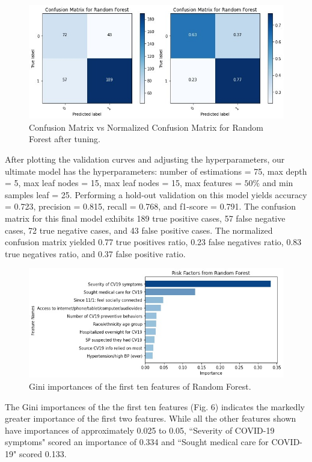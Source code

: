 \documentclass{article}
\begin{document}
\begin{figure}[H]
    \center
    \includegraphics[width= \columnwidth]{Figure 3.jpg}
    \caption{Confusion Matrix vs Normalized Confusion Matrix for Random Forest after tuning.}
\end{figure}

After plotting the validation curves and adjusting the hyperparameters, our ultimate model has the hyperparameters: number of estimations = 75, max depth = 5, max leaf nodes = 15, max leaf nodes = 15, max features = $50\%$ and min samples leaf = 25. Performing a hold-out validation on this model yields accuracy = 0.723, precision = 0.815, recall = 0.768, and f1-score = 0.791. The confusion matrix for this final model exhibits 189 true positive cases, 57 false negative cases, 72 true negative cases, and 43 false positive cases. The normalized confusion matrix yielded 0.77 true positives ratio, 0.23 false negatives ratio, 0.83 true negatives ratio, and 0.37 false positive ratio. 

  \begin{figure}[H]
    \center
    \includegraphics[width= \columnwidth]{Figure6.jpeg}
    \caption{Gini importances of the first ten features of Random Forest.}
  \end{figure}
  

The Gini importances of the the first ten features (Fig. 6) indicates the markedly greater importance of the first two features. While all the other features shown have importances of approximately 0.025 to 0.05, ``Severity of COVID-19 symptoms" scored an importance of 0.334 and ``Sought medical care for COVID-19" scored 0.133.
\end{document}
